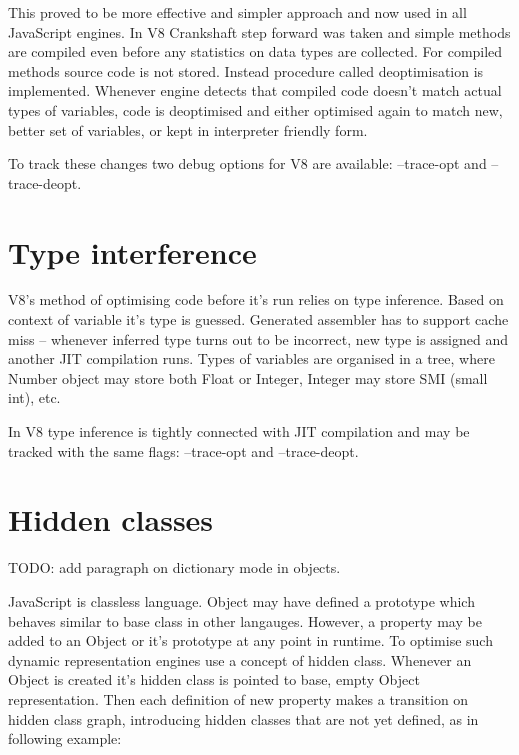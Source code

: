 This proved to be more effective and simpler approach and now used in all JavaScript engines. In V8 Crankshaft step forward was taken and simple methods are compiled even before any statistics on data types are collected. For compiled methods source code is not stored. Instead procedure called deoptimisation is implemented. Whenever engine detects that compiled code doesn't match actual types of variables, code is deoptimised and either optimised again to match new, better set of variables, or kept in interpreter friendly form.

To track these changes two debug options for V8 are available: --trace-opt and --trace-deopt.




\section{Type interference}
\label{sec:typeinterference}

V8's method of optimising code before it's run relies on type inference. Based on context of variable it's type is guessed. Generated assembler has to support cache miss -- whenever inferred type turns out to be incorrect, new type is assigned and another JIT compilation runs. Types of variables are organised in a tree, where Number object may store both Float or Integer, Integer may store SMI (small int), etc.



In V8 type inference is tightly connected with JIT compilation and may be tracked with the same flags: --trace-opt and --trace-deopt. 

\section{Hidden classes}
\label{sec:hiddenclasses}

TODO: add paragraph on dictionary mode in objects.

JavaScript is classless language. Object may have defined a prototype which behaves similar to base class in other langauges. However, a property may be added to an Object or it's prototype at any point in runtime. To optimise such dynamic representation engines use a concept of hidden class. Whenever an Object is created it's hidden class is pointed to base, empty Object representation. Then each definition of new property makes a transition on hidden class graph, introducing hidden classes that are not yet defined, as in following example:

